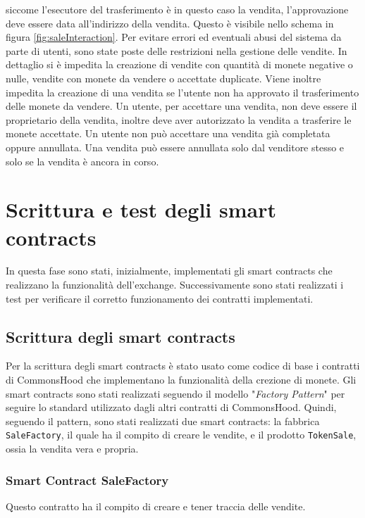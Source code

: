 \documentclass[a4paper]{article}
\begin{document}
        siccome l'esecutore del trasferimento è in questo caso la vendita, l'approvazione deve essere data all'indirizzo della vendita. Questo è visibile nello schema in figura \ref{fig:saleInteraction}.
        \newline
        Per evitare errori ed eventuali abusi del sistema da parte di utenti, sono state poste delle restrizioni nella gestione delle vendite. In dettaglio si è impedita la creazione di vendite con quantità di monete negative o nulle, vendite con monete da vendere o accettate duplicate.
        Viene inoltre impedita la creazione di una vendita se l'utente non ha approvato il trasferimento delle monete da vendere. Un utente, per accettare una vendita, non deve essere il proprietario della vendita, inoltre deve aver autorizzato la vendita a trasferire le monete accettate.
        Un utente non può accettare una vendita già completata oppure annullata. Una vendita può essere annullata solo dal venditore stesso e solo se la vendita è ancora in corso.

        \section{Scrittura e test degli smart contracts}
        In questa fase sono stati, inizialmente, implementati gli smart contracts che realizzano la funzionalità dell'exchange. Successivamente sono stati realizzati i test per verificare il corretto funzionamento dei contratti implementati.
        \subsection{Scrittura degli smart contracts}
        \label{writeContracts}
        Per la scrittura degli smart contracts è stato usato come codice di base i contratti di CommonsHood che implementano la funzionalità della crezione di monete.
        Gli smart contracts sono stati realizzati seguendo il modello "\emph{Factory Pattern}" per seguire lo standard utilizzato dagli altri contratti di CommonsHood. Quindi, seguendo il pattern, sono stati realizzati
        due smart contracts: la fabbrica \verb|SaleFactory|, il quale ha il compito di creare le vendite, e il prodotto \verb|TokenSale|, ossia la vendita vera e propria.
        \subsubsection{Smart Contract SaleFactory}
        Questo contratto ha il compito di creare e tener traccia delle vendite.
\end{document}
